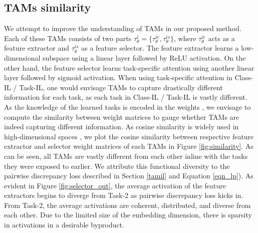 \documentclass{article} %
\begin{document}
\subsection{TAMs similarity}
We attempt to improve the understanding of TAMs in our proposed method.  Each of these TAMs consists of two parts $\tau^{i}_\theta = \{\tau^{ie}_\theta, \tau^{is}_\theta\}$, where $\tau^{ie}_\theta$ acts as a feature extractor and $\tau^{is}_\theta$ as a feature selector. The feature extractor learns a low-dimensional subspace using a linear layer followed by ReLU activation. On the other hand, the feature selector learns task-specific attention using another linear layer followed by sigmoid activation. When using task-specific attention in Class-IL / Task-IL, one would envisage TAMs to capture drastically different information for each task, as each task in Class-IL / Task-IL is vastly different. As the knowledge of the learned tasks is encoded in the weights \citep{krishnan2019biologically}, we envisage to compute the similarity between weight matrices to gauge whether TAMs are indeed capturing different information. As cosine similarity is widely used in high-dimensional spaces \citep{luo2018cosine}, we plot the cosine similarity between respective feature extractor and selector weight matrices of each TAMs in Figure \ref{fig:similarity}. As can be seen, all TAMs are vastly different from each other inline with the tasks they were exposed to earlier. We attribute this functional diversity to the pairwise discrepancy loss described in Section \ref{tamil} and Equation \ref{eqn_lp}). As evident in Figure \ref{fig:selector_out}, the average activation of the feature extractors begins to diverge from Task-2 as pairwise discrepancy loss kicks in. From Task-2, the average activations are coherent, distributed, and diverse from each other. Due to the limited size of the embedding dimension, there is sparsity in activations in a desirable byproduct. 
\end{document}
